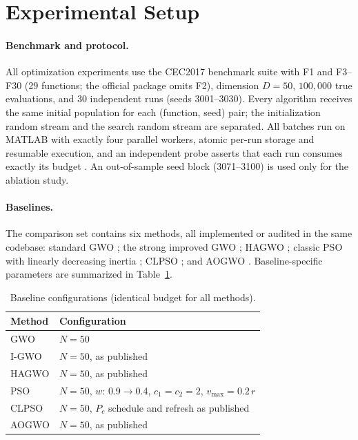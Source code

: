 \documentclass[journal]{IEEEtran}
\begin{document}
\section{Experimental Setup}
\paragraph{Benchmark and protocol.}
All optimization experiments use the CEC2017 benchmark suite with
F1 and F3--F30 (29 functions; the official package omits F2), dimension
$D=50$, $100{,}000$ true evaluations, and 30 independent runs (seeds
3001--3030). Every algorithm receives the same initial population for each
(function, seed) pair; the initialization random stream and the search random
stream are separated. All batches run on MATLAB with exactly four parallel
workers, atomic per-run storage and resumable execution, and an independent
probe asserts that each run consumes exactly its budget
\cite{awad2016problem}. An out-of-sample seed block (3071--3100) is used only
for the ablation study.

\paragraph{Baselines.}
The comparison set contains six methods, all implemented or audited in the
same codebase: standard GWO \cite{mirjalili2014gwo}; the strong improved GWO
\cite{nadimi2021igwo}; HAGWO \cite{su2026hagwo}; classic PSO with linearly
decreasing inertia \cite{kennedy1995pso,shi1998modified}; CLPSO
\cite{liang2006clpso}; and AOGWO \cite{khalid2026aogwo}. Baseline-specific
parameters are summarized in Table~\ref{tab:params}.

\begin{table}[t]
\centering
\small
\caption{Baseline configurations (identical budget for all methods).}
\label{tab:params}
\begin{tabular}{ll}
\toprule
Method & Configuration \\
\midrule
GWO & $N=50$ \\
I-GWO & $N=50$, as published \\
HAGWO & $N=50$, as published \\
PSO & $N=50$, $w$: 0.9$\to$0.4, $c_1=c_2=2$, $v_{\max}=0.2\,r$ \\
CLPSO & $N=50$, $P_c$ schedule and refresh as published \\
AOGWO & $N=50$, as published \\
\bottomrule
\end{tabular}
\end{table}
\end{document}
